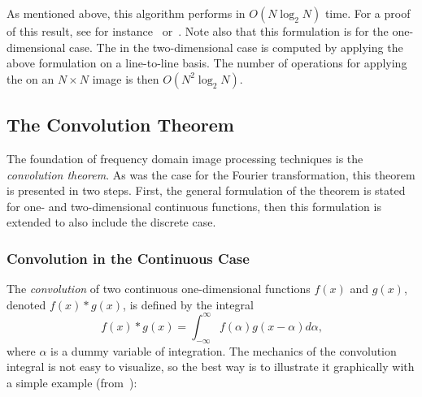As mentioned above, this algorithm performs in $O(N\log_{2}N)$ time.
For a proof of this result, see for instance~\cite{brigham}
or~\cite{digim}.  Note also that this formulation is for the
one-dimensional case.  The {\fft} in the two-dimensional case is
computed by applying the above formulation on a line-to-line basis.
The number of operations for applying the {\fft} on an $N\times N$
image is then $O(N^{2}\log_{2}N)$.


\subsection{The Convolution Theorem}
\label{image:frequency:convolution}

The foundation of frequency domain image processing techniques is the
{\em convolution theorem\/}.  As was the case for the Fourier
transformation, this theorem is presented in two steps.  First, the
general formulation of the theorem is stated for one- and
two-dimensional continuous functions, then this formulation is
extended to also include the discrete case.

\subsubsection{Convolution in the Continuous Case}

The {\em convolution\/} of two continuous one-dimensional functions
$f(x)$ and $g(x)$, denoted $f(x)\ast g(x)$, is defined by the integral
\begin{equation}
\label{eq:convolution:def}
  f(x)\ast g(x)=\int_{-\infty}^{\infty}f(\alpha)g(x-\alpha)d\alpha\mbox{,}
\end{equation}
where $\alpha$ is a dummy variable of integration.  The mechanics of
the convolution integral is not easy to visualize, so the best way is
to illustrate it graphically with a simple example
(from~\cite{digim}):


